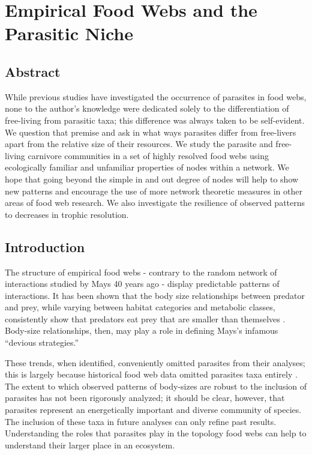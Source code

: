\documentclass[../dissertation.tex]{subfiles}
\title{}
\begin{document}
\maketitle

\chapter{Empirical Food Webs and the Parasitic Niche}

\section{Abstract}
While previous studies have investigated the occurrence of parasites in food
webs, none to the author's knowledge were dedicated solely to the
differentiation of free-living from parasitic taxa; this difference was always
taken to be self-evident. We question that premise and ask in what ways
parasites differ from free-livers apart from the relative size of their
resources. We study the parasite and free-living carnivore communities in a set
of highly resolved food webs using ecologically familiar and unfamiliar
properties of nodes within a network. We hope that going beyond the simple in
and out degree of nodes will help to show new patterns and encourage the use of
more network theoretic measures in other areas of food web research. We also
investigate the resilience of observed patterns to decreases in trophic
resolution.

\section{Introduction}

The structure of empirical food webs - contrary to the random network of interactions
studied by Mays 40 years ago - display predictable patterns of interactions.
It has been shown that the body size relationships between predator and prey,
while varying between habitat categories and metabolic classes, consistently
show that predators eat prey that are smaller than themselves
\cite{Brose2006a}. Body-size relationships, then, may play a role in defining
Mays's infamous ``devious strategies.'' 

These trends, when identified, conveniently omitted parasites from their
analyses; this is largely because historical food web data omitted parasites
taxa entirely \cite{Marcogliese1997}. The extent to which observed patterns of
body-sizes are robust to the inclusion of parasites has not been rigorously
analyzed; it should be clear, however, that parasites represent an
energetically important and diverse community of species. The inclusion of
these taxa in future analyses can only refine past results. Understanding the
roles that parasites play in the topology food webs can help to understand
their larger place in an ecosystem.
\end{document}
